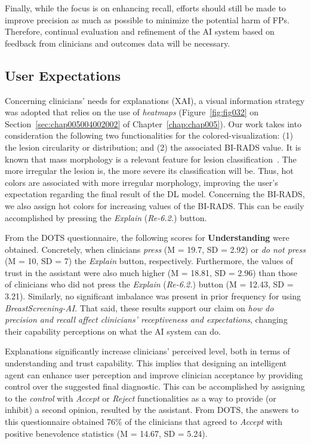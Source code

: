 Finally, while the focus is on enhancing recall, efforts should still be made to improve precision as much as possible to minimize the potential harm of \acp{FP}.
Therefore, continual evaluation and refinement of the \ac{AI} system based on feedback from clinicians and outcomes data will be necessary.

\subsection{User Expectations}
\label{sec:app003004007}

Concerning clinicians' needs for explanations (\acs{XAI}), a visual information strategy was adopted that relies on the use of {\it heatmaps} (Figure~\ref{fig:fig032} on Section~\ref{sec:chap005004002002} of Chapter~\ref{chap:chap005}).
Our work takes into consideration the following two functionalities for the colored-visualization:
(1) the lesion circularity or distribution; and
(2) the associated \ac{BI-RADS} value.
It is known that mass morphology is a relevant feature for lesion classification~\cite{maicas2018training}.
The more irregular the lesion is, the more severe its classification will be.
Thus, hot colors are associated with more irregular morphology, improving the user's expectation regarding the final result of the \ac{DL} model.
Concerning the \ac{BI-RADS}, we also assign hot colors for increasing values of the \ac{BI-RADS}. 
This can be easily accomplished by pressing the {\it Explain} ({\it Re-6.2.}) button.

From the \ac{DOTS} questionnaire, the following scores for {\bf Understanding} were obtained.
Concretely, when clinicians {\it press} (M = 19.7, SD = 2.92) or {\it do not press} (M = 10, SD = 7) the  {\it Explain} button, respectively.
Furthermore, the values of trust in the assistant were also much higher (M = 18.81, SD = 2.96) than those of clinicians who did not press the {\it Explain} ({\it Re-6.2.}) button (M = 12.43, SD = 3.21).
Similarly, no significant imbalance was present in prior frequency for using {\it BreastScreening-AI}.
That said, these results support our claim on {\it how do precision and recall affect clinicians' receptiveness and expectations}, changing their capability perceptions on what the \ac{AI} system can do.

Explanations significantly increase clinicians’ perceived level, both in terms of understanding and trust capability.
This implies that designing an intelligent agent can enhance user perception and improve clinician acceptance by providing control over the suggested final diagnostic.
This can be accomplished by assigning to the {\it control} with {\it Accept} or {\it Reject} functionalities as a way to provide (or inhibit) a second opinion, resulted by the assistant.
From \ac{DOTS}, the answers to this questionnaire obtained 76\% of the clinicians that agreed to {\it Accept} with positive benevolence statistics (M = 14.67, SD = 5.24).

